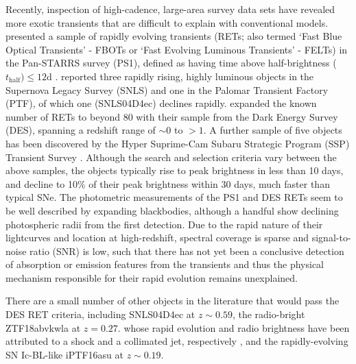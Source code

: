 \documentclass[fleqn,usenatbib,]{mnras}
\newcommand{\replyref}[1]{\color{magenta}#1 \color{black}}
\begin{document}
Recently, inspection of high-cadence, large-area survey data sets have revealed more exotic transients that are difficult to explain with conventional models. \citet{Drout2014} presented a sample of rapidly evolving transients (RETs; also termed `Fast Blue Optical Transients' - FBOTs or `Fast Evolving Luminous Transients' - FELTs) in the Pan-STARRS survey (PS1), \replyref{defined as having time above half-brightness ($t_{\mathrm{half}}) \leq12$d}. \citet{Arcavi2016} reported three rapidly rising, highly luminous objects in the Supernova Legacy Survey (SNLS) and one in the Palomar Transient Factory (PTF), of which one (SNLS04D4ec) declines rapidly. \citet[hereafter P18]{Pursiainen2018} expanded the known number of RETs to beyond 80 with their sample from the Dark Energy Survey (DES), spanning a redshift range of $\sim 0$ to $>1$. A further sample of five objects has been discovered by the Hyper Suprime-Cam Subaru Strategic Program (SSP) Transient Survey \citep{Tampo2020}. \replyref{Although the search and selection criteria vary between the above samples, the objects} typically rise to peak brightness in less than 10 days, and decline to 10\% of their peak brightness within 30 days, much faster than typical SNe. The photometric measurements of the PS1 and DES RETs seem to be well described by expanding blackbodies, although a handful show declining photospheric radii from the first detection. Due to the rapid nature of their lightcurves and location at high-redshift, spectral coverage is sparse and signal-to-noise ratio (SNR) is low, such that there has not yet been a conclusive detection of absorption or emission features from the transients and thus the physical mechanism responsible for their rapid evolution remains unexplained.

There are a small number of other objects in the literature that would pass the DES RET criteria, including SNLS04D4ec \citep{Arcavi2016} at $z\sim0.59$, \replyref{the radio-bright} ZTF18abvkwla \replyref{ at $z=0.27$. whose rapid evolution and radio brightness have been attributed to a shock and a collimated jet, respectively \citep{Ho2020}, and the rapidly-evolving SN Ic-BL-like iPTF16asu \citep{Whitesides2017} at $z\sim0.19$. }
\end{document}
